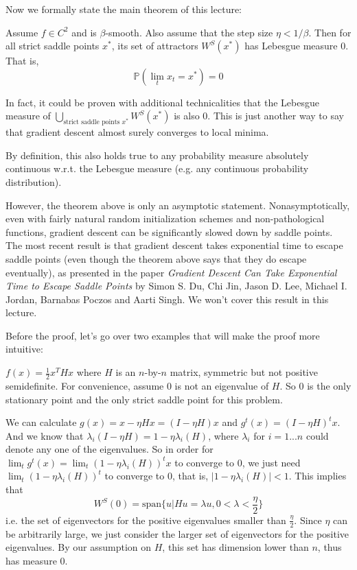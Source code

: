 \noindent
Now we formally state the main theorem of this lecture:
\begin{theorem}
Assume $f\in C^2$ and is $\beta$-smooth. Also assume that the step size $\eta < 1/\beta$. Then for all strict saddle points $x^*$, its set of attractors $W^S(x^*)$ has Lebesgue measure 0. That is,
$$\mathbb{P}(\lim_t x_t = x^*) = 0$$
\end{theorem}

\begin{remark}
In fact, it could be proven with additional technicalities that the Lebesgue measure of 
$
\bigcup_{\text{strict saddle points }x^*} W^S(x^*)
$
is also 0. This is just another way to say that gradient descent almost surely converges to local minima. 
\end{remark}

\begin{remark}
By definition, this also holds true to any probability measure absolutely continuous w.r.t. the Lebesgue measure (e.g. any continuous probability distribution).
\end{remark}

\noindent
However, the theorem above is only an asymptotic statement. Nonasymptotically, even with fairly natural random initialization schemes and non-pathological functions, gradient descent can be significantly slowed down by saddle points. 
The most recent result is that gradient descent takes exponential time to escape saddle points (even though the theorem above says that they do escape eventually), as presented in the paper
\textit{Gradient Descent Can Take Exponential Time to Escape Saddle Points} by Simon S. Du, Chi Jin, Jason D. Lee, Michael I. Jordan, Barnabas Poczos and Aarti Singh. We won't cover this result in this lecture.

\noindent
Before the proof, let's go over two examples that will make the proof more intuitive:

\begin{example}
$f(x) = \frac{1}{2} x^THx$ where $H$ is an $n$-by-$n$ matrix, symmetric but not positive semidefinite. 
For convenience, assume $0$ is not an eigenvalue of $H$.
So $0$ is the only stationary point and the only strict saddle point for this problem.

\noindent
We can calculate
$g(x) = x - \eta Hx = (I-\eta H)x$ and 
$g^t(x) = (I-\eta H)^tx$. 
And we know that 
$\lambda_i(I - \eta H) = 
1-\eta \lambda_i(H)$, where $\lambda_i$ for $i=1...n$ could denote any one of the eigenvalues.
So in order for $\lim_t g^t(x) = \lim_t (1-\eta \lambda_i(H))^t x$ to converge to 0, we just need $\lim_t (1-\eta \lambda_i(H))^t$ to converge to 0, that is, $|1-\eta \lambda_i(H)| < 1$. This implies that
$$W^S(0) = \text{span}\bigg\{ u| Hu=\lambda u,  0< \lambda < \frac{\eta}{2} \bigg\}$$
i.e. the set of eigenvectors for the positive eigenvalues smaller than 
$\frac{\eta}{2}$. Since $\eta$ can be arbitrarily large, we just consider the larger set of eigenvectors for the positive eigenvalues. By our assumption on $H$, this set has dimension lower than $n$, thus has measure 0.
\end{example}

